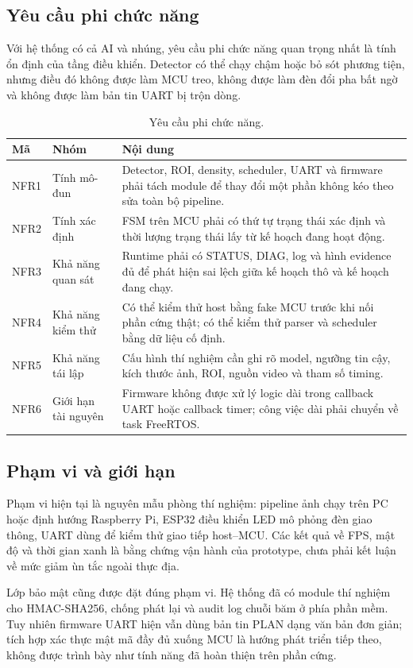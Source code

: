 \subsection{Yêu cầu phi chức năng}

Với hệ thống có cả AI và nhúng, yêu cầu phi chức năng quan trọng nhất là tính ổn định của tầng điều khiển. Detector có thể chạy chậm hoặc bỏ sót phương tiện, nhưng điều đó không được làm MCU treo, không được làm đèn đổi pha bất ngờ và không được làm bản tin UART bị trộn dòng.

\begin{table}[H]
\centering
\caption{Yêu cầu phi chức năng.}
\label{tab:nonfunctional-reqs}
\footnotesize
\setlength{\tabcolsep}{4pt}
\renewcommand{\arraystretch}{1.16}
\begin{tabularx}{\linewidth}{C{1.2cm}R{3.6cm}Y}
\toprule
\textbf{Mã} & \textbf{Nhóm} & \textbf{Nội dung} \\
\midrule
NFR1 & Tính mô-đun & Detector, ROI, density, scheduler, UART và firmware phải tách module để thay đổi một phần không kéo theo sửa toàn bộ pipeline. \\
NFR2 & Tính xác định & FSM trên MCU phải có thứ tự trạng thái xác định và thời lượng trạng thái lấy từ kế hoạch đang hoạt động. \\
NFR3 & Khả năng quan sát & Runtime phải có STATUS, DIAG, log và hình evidence đủ để phát hiện sai lệch giữa kế hoạch thô và kế hoạch đang chạy. \\
NFR4 & Khả năng kiểm thử & Có thể kiểm thử host bằng fake MCU trước khi nối phần cứng thật; có thể kiểm thử parser và scheduler bằng dữ liệu cố định. \\
NFR5 & Khả năng tái lập & Cấu hình thí nghiệm cần ghi rõ model, ngưỡng tin cậy, kích thước ảnh, ROI, nguồn video và tham số timing. \\
NFR6 & Giới hạn tài nguyên & Firmware không được xử lý logic dài trong callback UART hoặc callback timer; công việc dài phải chuyển về task FreeRTOS. \\
\bottomrule
\end{tabularx}
\normalsize
\end{table}

\subsection{Phạm vi và giới hạn}

Phạm vi hiện tại là nguyên mẫu phòng thí nghiệm: pipeline ảnh chạy trên PC hoặc định hướng Raspberry Pi, ESP32 điều khiển LED mô phỏng đèn giao thông, UART dùng để kiểm thử giao tiếp host--MCU. Các kết quả về FPS, mật độ và thời gian xanh là bằng chứng vận hành của prototype, chưa phải kết luận về mức giảm ùn tắc ngoài thực địa.

Lớp bảo mật cũng được đặt đúng phạm vi. Hệ thống đã có module thí nghiệm cho HMAC-SHA256, chống phát lại và audit log chuỗi băm ở phía phần mềm. Tuy nhiên firmware UART hiện vẫn dùng bản tin PLAN dạng văn bản đơn giản; tích hợp xác thực mật mã đầy đủ xuống MCU là hướng phát triển tiếp theo, không được trình bày như tính năng đã hoàn thiện trên phần cứng.
